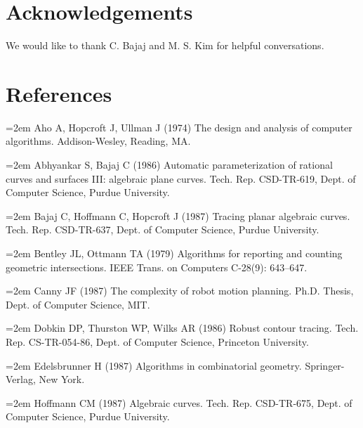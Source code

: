 \section*{Acknowledgements}
We would like to thank C. Bajaj and M. S. Kim for helpful conversations.

\section*{References}


\parskip=0pt
\parindent=20pt
\hangindent=2em  %
Aho A, Hopcroft J, Ullman J (1974)
The design and analysis of computer algorithms.
Addison-Wesley, Reading, MA.

\hangindent=2em  %
\noindent 
Abhyankar S, Bajaj C (1986)
Automatic parameterization of rational curves and surfaces III:
algebraic plane curves.
Tech. Rep. CSD-TR-619, Dept. of Computer Science, Purdue University.

\hangindent=2em  %
\noindent 
Bajaj C, Hoffmann C, Hopcroft J (1987)
Tracing planar algebraic curves.
Tech. Rep. \mbox{CSD-TR-637}, Dept. of Computer Science, Purdue University.

\hangindent=2em  %
\noindent 
Bentley JL, Ottmann TA (1979)
Algorithms for reporting and counting geometric intersections.
IEEE Trans. on Computers C-28(9): 643--647.

\hangindent=2em  %
\noindent 
Canny JF (1987) The complexity of robot motion planning.
Ph.D. Thesis, Dept. of Computer Science, MIT.

\hangindent=2em  %
\noindent 
Dobkin DP, Thurston WP, Wilks AR (1986)
Robust contour tracing.
Tech. Rep. CS-TR-054-86, Dept. of Computer Science, Princeton University.

\hangindent=2em  %
\noindent 
Edelsbrunner H (1987) Algorithms in combinatorial geometry.
Springer-Verlag, New York.

\hangindent=2em  %
\noindent 
Hoffmann CM (1987) 
Algebraic curves.
Tech. Rep. CSD-TR-675, Dept. of Computer Science, Purdue University.

